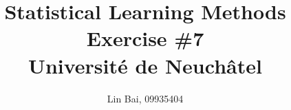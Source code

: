 \documentclass[12pt]{article}
\begin{document}
	
	
	
	\title{\textbf{Statistical Learning Methods Exercise \#{7}}\\
	Universit{\'e} de Neuch\^{a}tel}%
	\author{{Lin Bai, 09935404}} %
	
	\maketitle

\end{document}
